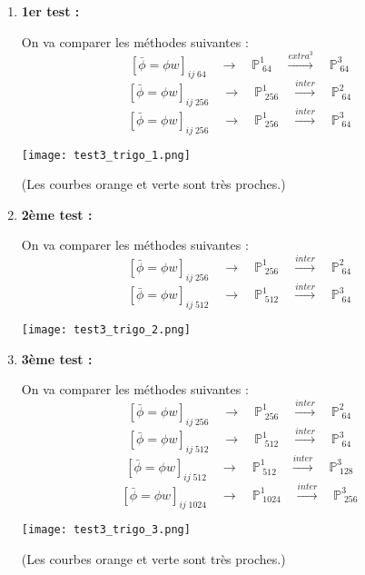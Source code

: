 \begin{enumerate}[label=\textbullet]
	\item \textbf{1er test : } 
	
	\begin{minipage}{0.48\linewidth}
		On va comparer les méthodes suivantes :
		$$[\bar{\phi}=\phi w]_{ij \; 64} \quad \longrightarrow \quad \mathbb{P}^1_{\; 64} \quad \overset{extra^3}{\longrightarrow} \quad \mathbb{P}^3_{\; 64}$$
		$$[\bar{\phi}=\phi w]_{ij \; 256} \quad \longrightarrow \quad \mathbb{P}^1_{\; 256} \quad \overset{inter}{\longrightarrow} \quad \mathbb{P}^2_{\; 64}$$
		$$[\bar{\phi}=\phi w]_{ij \; 256} \quad \longrightarrow \quad \mathbb{P}^1_{\; 256} \quad \overset{inter}{\longrightarrow} \quad \mathbb{P}^3_{\; 64}$$
	\end{minipage}
	\begin{minipage}{0.48\linewidth}
		\centering
		\texttt{[image: test3\_trigo\_1.png]}
	\end{minipage}

	(Les courbes orange et verte sont très proches.)

	\item \textbf{2ème test : } 
	
	\begin{minipage}{0.48\linewidth}
		On va comparer les méthodes suivantes :
		$$[\bar{\phi}=\phi w]_{ij \; 256} \quad \longrightarrow \quad \mathbb{P}^1_{\; 256} \quad \overset{inter}{\longrightarrow} \quad \mathbb{P}^2_{\; 64}$$
		$$[\bar{\phi}=\phi w]_{ij \; 512} \quad \longrightarrow \quad \mathbb{P}^1_{\; 512} \quad \overset{inter}{\longrightarrow} \quad \mathbb{P}^3_{\; 64}$$
	\end{minipage}
	\begin{minipage}{0.48\linewidth}
		\centering
		\texttt{[image: test3\_trigo\_2.png]}
	\end{minipage}

	\item \textbf{3ème test : } 
	
	\begin{minipage}{0.48\linewidth}
		On va comparer les méthodes suivantes :
		$$[\bar{\phi}=\phi w]_{ij \; 256} \quad \longrightarrow \quad \mathbb{P}^1_{\; 256} \quad \overset{inter}{\longrightarrow} \quad \mathbb{P}^2_{\; 64}$$
		$$[\bar{\phi}=\phi w]_{ij \; 512} \quad \longrightarrow \quad \mathbb{P}^1_{\; 512} \quad \overset{inter}{\longrightarrow} \quad \mathbb{P}^3_{\; 64}$$
		$$[\bar{\phi}=\phi w]_{ij \; 512} \quad \longrightarrow \quad \mathbb{P}^1_{\; 512} \quad \overset{inter}{\longrightarrow} \quad \mathbb{P}^3_{\; 128}$$
		$$[\bar{\phi}=\phi w]_{ij \; 1024} \quad \longrightarrow \quad \mathbb{P}^1_{\; 1024} \quad \overset{inter}{\longrightarrow} \quad \mathbb{P}^3_{\; 256}$$
	\end{minipage}
	\begin{minipage}{0.48\linewidth}
		\centering
		\texttt{[image: test3\_trigo\_3.png]}
	\end{minipage}
	
	(Les courbes orange et verte sont très proches.)

\end{enumerate}

